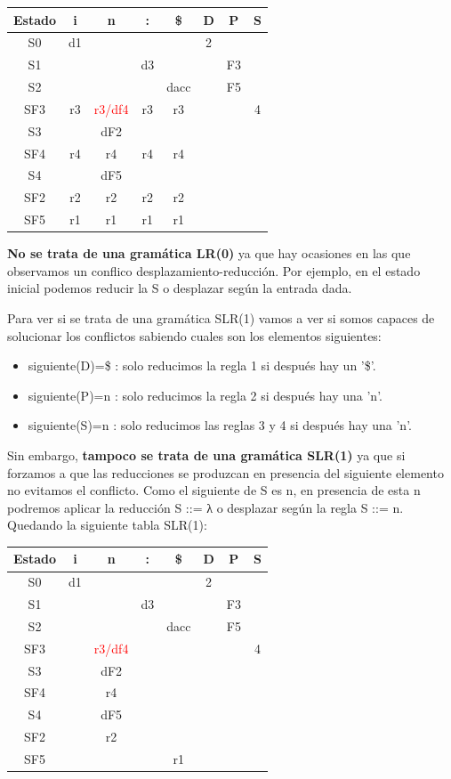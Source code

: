 \documentclass[nochap]{apuntes}
\begin{document}
\begin{problem}
\ppart
\begin{tabular}{| c | c | c | c | c | c | c | c | }
\hline
Estado & i & n & : & \$ & D & P & S\\
\hline
S0 & d1 & &  &  & 2 &  & \\
\hline
S1 &  &  & d3 &  &  & F3 & \\
\hline
S2 &  &  &  & dacc &  & F5 &\\
\hline
SF3 & r3 & \textcolor{red}{r3/df4} & r3 & r3 &  &  & 4\\
\hline
S3 &  & dF2 & &  &  &  & \\
\hline
SF4 & r4  & r4  & r4 & r4 & &  &\\
\hline
S4 &  & dF5 &  &  &  &  & \\
\hline
SF2 & r2 & r2 & r2 & r2 &  &  & \\
\hline
SF5 & r1 & r1 & r1 & r1 &  &  & \\
\hline
\end{tabular}
\ppart \textbf{No se trata de una gramática LR(0)} ya que hay ocasiones en las que observamos un conflico desplazamiento-reducción. Por ejemplo, en el estado inicial podemos reducir la S o desplazar según la entrada dada.

Para ver si se trata de una gramática SLR(1) vamos a ver si somos capaces de solucionar los conflictos sabiendo cuales son los elementos siguientes:
\begin{itemize}
\item siguiente(D)={\$} : solo reducimos la regla 1 si después hay un '\$'.
\item siguiente(P)={n} : solo reducimos la regla 2 si después hay una 'n'.
\item siguiente(S)={n} : solo reducimos las reglas 3 y 4 si después hay una 'n'.
\end{itemize}

Sin embargo, \textbf{tampoco se trata de una gramática SLR(1)} ya que si forzamos a que las reducciones se produzcan en presencia del siguiente elemento no evitamos el conflicto. Como el siguiente de S es n, en presencia de esta n podremos aplicar la reducción S ::= λ o desplazar según la regla S ::= n. Quedando la siguiente tabla SLR(1):

\begin{tabular}{| c | c | c | c | c | c | c | c | }
\hline
Estado & i & n & : & \$ & D & P & S\\
\hline
S0 & d1 & &  &  & 2 &  & \\
\hline
S1 &  &  & d3 &  &  & F3 & \\
\hline
S2 &  &  &  & dacc &  & F5 &\\
\hline
SF3 &  & \textcolor{red}{r3/df4} &  &  &  &  & 4\\
\hline
S3 &  & dF2 & &  &  &  & \\
\hline
SF4 &   & r4  &  &  & &  &\\
\hline
S4 &  & dF5 &  &  &  &  & \\
\hline
SF2 &  & r2 &  &  &  &  & \\
\hline
SF5 &  &  &  & r1  &  &  & \\
\hline
\end{tabular}

\end{problem}
\end{document}

